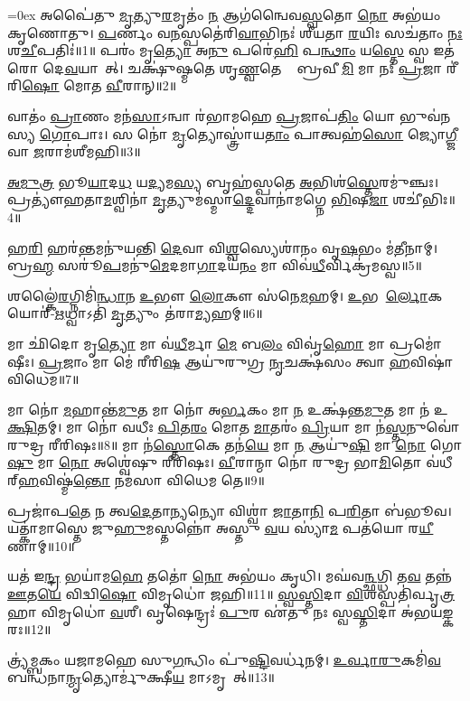 \let\oldparskip\parskip
\parskip=0ex
𑌅𑌪𑍈॑𑌤𑍁 \ul{𑌮𑍃}𑌤𑍍𑌯𑍁\ul{𑌰}𑌮𑍃𑌤𑌂॑ \ul{𑌨} 𑌆𑌗॑𑌨𑍍𑌵𑍈𑌵\ul{𑌸𑍍𑌵}𑌤𑍋 \ul{𑌨𑍋} 𑌅𑌭॑𑌯𑌂 𑌕𑍃𑌣𑍋𑌤𑍁।
\ul{𑌪}𑌰𑍍𑌣𑌂 𑌵\ul{𑌨}𑌸𑍍𑌪𑌤𑍇॑𑌰𑌿\ul{𑌵𑌾}𑌭𑌿𑌨𑌃॑ 𑌶𑍀𑌯𑌤𑌾 \ul{𑌰}𑌯𑌿𑌃 𑌸𑌚॑𑌤𑌾𑌂 \ul{𑌨𑌃} 𑌶\ul{𑌚𑍀}𑌪𑌤𑌿𑌃॑॥1॥
𑌪𑌰𑌂॑ 𑌮𑍃\ul{𑌤𑍍𑌯𑍋} 𑌅\ul{𑌨𑍁} 𑌪𑌰𑍇॑\ul{𑌹𑌿} 𑌪\ul{𑌨𑍍𑌥𑌾𑌂} 𑌯\ul{𑌸𑍍𑌤𑍇} 𑌸𑍍𑌵 𑌇𑌤॑𑌰𑍋 𑌦𑍇\ul{𑌵}𑌯𑌾𑌨𑌾᳚𑌤𑍍।
𑌚𑌕𑍍𑌷𑍁॑𑌷𑍍𑌮𑌤𑍇 𑌶𑍃\ul{𑌣𑍍𑌵}𑌤𑍇 𑌤𑍇᳚ 𑌬𑍍𑌰𑌵𑍀\ul{𑌮𑌿} 𑌮𑌾 𑌨𑌃॑ \ul{𑌪𑍍𑌰}𑌜𑌾 𑌰𑍀॑𑌰𑌿\ul{𑌷𑍋} 𑌮𑍋𑌤 \ul{𑌵𑍀}𑌰𑌾𑌨𑍍॥2॥

𑌵𑌾𑌤𑌂॑ \ul{𑌪𑍍𑌰𑌾}𑌣𑌂 𑌮𑌨॑\ul{𑌸𑌾}𑌽𑌨𑍍𑌵𑌾 𑌰॑𑌭𑌾𑌮𑌹𑍇 \ul{𑌪𑍍𑌰}𑌜𑌾𑌪॑\ul{𑌤𑌿𑌂} 𑌯𑍋 𑌭𑍁𑌵॑𑌨𑌸𑍍𑌯 \ul{𑌗𑍋}𑌪𑌾𑌃।
𑌸 𑌨𑍋॑ \ul{𑌮𑍃}𑌤𑍍𑌯𑍋𑌸𑍍𑌤𑍍𑌰𑌾॑𑌯\ul{𑌤𑌾𑌂} 𑌪𑌾𑌤𑍍𑌵𑌹॑\ul{𑌸𑍋} 𑌜𑍍𑌯𑍋\ul{𑌗𑍍𑌜𑍀}𑌵𑌾 \ul{𑌜}𑌰𑌾𑌮॑𑌶𑍀𑌮𑌹𑌿॥3॥

\ul{𑌅}\ul{𑌮𑍁}\ul{𑌤𑍍𑌰} 𑌭𑍂\ul{𑌯𑌾}𑌦\ul{𑌧} 𑌯\ul{𑌦𑍍𑌯}𑌮\ul{𑌸𑍍𑌯} 𑌬𑍃𑌹॑𑌸𑍍𑌪𑌤𑍇 \ul{𑌅}𑌭𑌿𑌶॑\ul{𑌸𑍍𑌤𑍇}𑌰𑌮𑍁॑𑌞𑍍𑌚𑌃।
𑌪𑍍𑌰𑌤𑍍𑌯𑍗॑𑌹𑌤𑌾\ul{𑌮}𑌶𑍍𑌵𑌿𑌨𑌾॑ \ul{𑌮𑍃}𑌤𑍍𑌯𑍁𑌮॑𑌸𑍍𑌮𑌾\ul{𑌦𑍍𑌦𑍇}𑌵𑌾𑌨𑌾॑𑌮𑌗𑍍𑌨𑍇 \ul{𑌭𑌿}𑌷\ul{𑌜𑌾} 𑌶𑌚𑍀॑𑌭𑌿𑌃॥4॥

𑌹\ul{𑌰𑌿}\ul{} 𑌹𑌰॑\ul{𑌨𑍍𑌤}𑌮𑌨𑍁॑𑌯𑌨𑍍𑌤𑌿 \ul{𑌦𑍇}𑌵𑌾 𑌵𑌿\ul{𑌶𑍍𑌵}𑌸𑍍𑌯𑍇𑌶𑌾॑𑌨𑌂 𑌵𑍃\ul{𑌷}𑌭𑌂 𑌮॑\ul{𑌤𑍀}𑌨𑌾𑌮𑍍।
𑌬𑍍𑌰\ul{𑌹𑍍𑌮} 𑌸𑌰𑍂॑\ul{𑌪}𑌮𑌨𑍁॑\ul{𑌮𑍇}𑌦𑌮𑌾\ul{𑌗𑌾}𑌦𑌯॑\ul{𑌨𑌂} 𑌮𑌾 𑌵𑌿𑌵॑\ul{𑌧𑍀}𑌰𑍍𑌵𑌿𑌕𑍍𑌰॑𑌮𑌸𑍍𑌵॥5॥

𑌶𑌲𑍍𑌕𑍈॑\ul{𑌰}𑌗𑍍𑌨𑌿𑌮𑌿॑\ul{𑌨𑍍𑌧𑌾}𑌨 \ul{𑌉}𑌭𑍗 \ul{𑌲𑍋}𑌕𑍗 𑌸॑𑌨𑍇\ul{𑌮}𑌹𑌮𑍍।
\ul{𑌉}𑌭𑌯𑍋᳚\ul{𑌰𑍍𑌲𑍋}𑌕𑌯𑍋𑌰𑍍॑-\ul{𑌋}𑌧𑍍𑌵𑌾𑌽𑌤𑌿॑ \ul{𑌮𑍃}𑌤𑍍𑌯𑍁𑌂 𑌤॑𑌰𑌾\ul{𑌮𑍍𑌯}𑌹𑌮𑍍॥6॥

𑌮𑌾 𑌛𑌿॑𑌦𑍋 𑌮𑍃\ul{𑌤𑍍𑌯𑍋} 𑌮𑌾 𑌵॑\ul{𑌧𑍀}𑌰𑍍𑌮𑌾 \ul{𑌮𑍇} 𑌬\ul{𑌲𑌂} 𑌵𑌿𑌵𑍃॑\ul{𑌹𑍋} 𑌮𑌾 𑌪𑍍𑌰𑌮𑍋॑𑌷𑍀𑌃।
\ul{𑌪𑍍𑌰}𑌜𑌾𑌂 𑌮𑌾 𑌮𑍇॑ 𑌰𑍀𑌰𑌿\ul{𑌷} 𑌆𑌯𑍁॑𑌰𑍁𑌗𑍍𑌰 \ul{𑌨𑍃}𑌚𑌕𑍍𑌷॑𑌸𑌂 𑌤𑍍𑌵𑌾 \ul{𑌹}𑌵𑌿𑌷𑌾॑ 𑌵𑌿𑌧𑍇𑌮॥7॥

𑌮𑌾 𑌨𑍋॑ \ul{𑌮}𑌹𑌾𑌨𑍍𑌤॑\ul{𑌮𑍁}𑌤 𑌮𑌾 𑌨𑍋॑ 𑌅\ul{𑌰𑍍𑌭}𑌕𑌂 𑌮𑌾 \ul{𑌨} 𑌉𑌕𑍍𑌷॑𑌨𑍍𑌤\ul{𑌮𑍁}𑌤 𑌮𑌾 𑌨॑ 𑌉\ul{𑌕𑍍𑌷𑌿}𑌤𑌮𑍍।
 𑌮𑌾 𑌨𑍋॑ 𑌵𑌧𑍀𑌃 \ul{𑌪𑌿}𑌤\ul{𑌰𑌂} 𑌮𑍋𑌤 \ul{𑌮𑌾}𑌤𑌰𑌂॑ \ul{𑌪𑍍𑌰𑌿}𑌯𑌾 𑌮𑌾 𑌨॑\ul{𑌸𑍍𑌤}𑌨𑍁𑌵𑍋॑ 𑌰𑍁𑌦𑍍𑌰 𑌰𑍀𑌰𑌿𑌷𑌃॥8॥
 𑌮𑌾 𑌨॑\ul{𑌸𑍍𑌤𑍋}𑌕𑍇 𑌤𑌨॑\ul{𑌯𑍇} 𑌮𑌾 \ul{𑌨} 𑌆𑌯𑍁॑\ul{𑌷𑌿} 𑌮𑌾 \ul{𑌨𑍋} 𑌗𑍋\ul{𑌷𑍁} 𑌮𑌾 \ul{𑌨𑍋} 𑌅𑌶𑍍𑌵𑍇॑𑌷𑍁 𑌰𑍀𑌰𑌿𑌷𑌃।
 \ul{𑌵𑍀}𑌰𑌾𑌨𑍍𑌮𑌾 𑌨𑍋॑ 𑌰𑍁𑌦𑍍𑌰 𑌭𑌾\ul{𑌮𑌿}𑌤𑍋 𑌵॑𑌧𑍀𑌰𑍍‌\ul{𑌹}𑌵𑌿𑌷𑍍𑌮॑\ul{𑌨𑍍𑌤𑍋} 𑌨𑌮॑𑌸𑌾 𑌵𑌿𑌧𑍇𑌮 𑌤𑍇॥9॥

𑌪𑍍𑌰𑌜𑌾॑𑌪\ul{𑌤𑍇} 𑌨 𑌤𑍍𑌵\ul{𑌦𑍇}𑌤𑌾\ul{𑌨𑍍𑌯}𑌨𑍍𑌯𑍋 𑌵𑌿𑌶𑍍𑌵𑌾॑ \ul{𑌜𑌾}𑌤𑌾\ul{𑌨𑌿} 𑌪\ul{𑌰𑌿}𑌤𑌾 𑌬॑𑌭𑍂𑌵।
𑌯𑌤𑍍𑌕𑌾॑𑌮𑌾𑌸𑍍𑌤𑍇 𑌜𑍁\ul{𑌹𑍁}𑌮𑌸𑍍𑌤𑌨𑍍𑌨𑍋॑ 𑌅𑌸𑍍𑌤𑍁 \ul{𑌵}𑌯 𑌸𑍍𑌯𑌾॑\ul{𑌮} 𑌪𑌤॑𑌯𑍋 𑌰\ul{𑌯𑍀}𑌣𑌾𑌮𑍍॥10॥

𑌯𑌤॑ 𑌇\ul{𑌨𑍍𑌦𑍍𑌰} 𑌭𑌯𑌾॑𑌮\ul{𑌹𑍇} 𑌤𑌤𑍋॑ \ul{𑌨𑍋} 𑌅𑌭॑𑌯𑌂 𑌕𑍃𑌧𑌿।
𑌮𑌘॑𑌵\ul{𑌨𑍍𑌛}𑌗𑍍𑌧𑌿 𑌤\ul{𑌵} 𑌤𑌨𑍍𑌨॑ \ul{𑌊}𑌤\ul{𑌯𑍇} 𑌵𑌿𑌦𑍍𑌵𑌿\ul{𑌷𑍋} 𑌵𑌿𑌮𑍃𑌧𑍋॑ 𑌜𑌹𑌿॥11॥
\ul{𑌸𑍍𑌵}\ul{𑌸𑍍𑌤𑌿}𑌦𑌾 \ul{𑌵𑌿}𑌶𑌸𑍍𑌪𑌤𑌿॑𑌰𑍍𑌵𑍃\ul{𑌤𑍍𑌰}𑌹𑌾 𑌵𑌿𑌮𑍃𑌧𑍋॑ \ul{𑌵}𑌶𑍀।
𑌵𑍃𑌷𑍇𑌨𑍍𑌦𑍍𑌰𑌃॑ \ul{𑌪𑍁}𑌰 𑌏॑𑌤𑍁 𑌨𑌃 𑌸𑍍𑌵\ul{𑌸𑍍𑌤𑌿}𑌦𑌾 𑌅॑𑌭𑌯\ul{𑌙𑍍𑌕}𑌰𑌃॥12॥

𑌤𑍍𑌰𑍍𑌯॑𑌮𑍍𑌬𑌕𑌂 𑌯𑌜𑌾𑌮𑌹𑍇 𑌸𑍁\ul{𑌗}𑌨𑍍𑌧𑌿𑌂 𑌪𑍁॑\ul{𑌷𑍍𑌟𑌿}𑌵𑌰𑍍𑌧॑𑌨𑌮𑍍।
 \ul{𑌉}\ul{𑌰𑍍𑌵𑌾}\ul{𑌰𑍁}𑌕𑌮𑌿॑\ul{𑌵} 𑌬𑌨𑍍𑌧॑𑌨𑌾\ul{𑌨𑍍𑌮𑍃}𑌤𑍍𑌯𑍋𑌰𑍍𑌮𑍁॑𑌕𑍍𑌷𑍀\ul{𑌯} 𑌮𑌾𑌽𑌮𑍃𑌤𑌾᳚𑌤𑍍॥13॥

